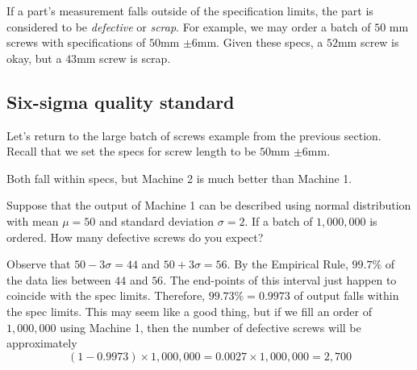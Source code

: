 \documentclass{ximera}
\begin{document}
\begin{center}
      \end{center}

If a part's measurement falls outside of the specification limits, the part is considered to be \emph{defective} or \emph{scrap}.  For example, we may order a batch of $50$ mm screws with specifications of $50$mm $\pm 6$mm.   Given these specs, a $52$mm screw is okay, but a $43$mm screw is scrap.

\subsection*{Six-sigma quality standard}
Let's return to the large batch of screws example from the previous section.  Recall that we set the specs for screw length to be $50$mm $\pm 6$mm.  

Both fall within specs, but Machine 2 is much better than Machine 1.

\begin{onlineOnly}
\begin{center} 
\end{center}
\end{onlineOnly}

\begin{example}\label{ex:defParts1}
    Suppose that the output of Machine 1 can be described using normal distribution with mean $\mu=50$ and standard deviation $\sigma=2$.  If a batch of $1,000,000$ is ordered.  How many defective screws do you expect?
    \begin{explanation}
        Observe that $50-3\sigma=44$ and $50+3\sigma=56$.  By the Empirical Rule, $99.7\%$ of the data lies between $44$ and $56$.  The end-points of this interval just happen to coincide with the spec limits.  Therefore, $99.73\%=0.9973$ of output falls within the spec limits.  This may seem like a good thing, but if we fill an order of $1,000,000$ using Machine 1, then the number of defective screws will be approximately
        $$(1-0.9973)\times 1,000,000=0.0027\times 1,000,000=2,700$$
        
    \end{explanation}
\end{example}
\end{document}
